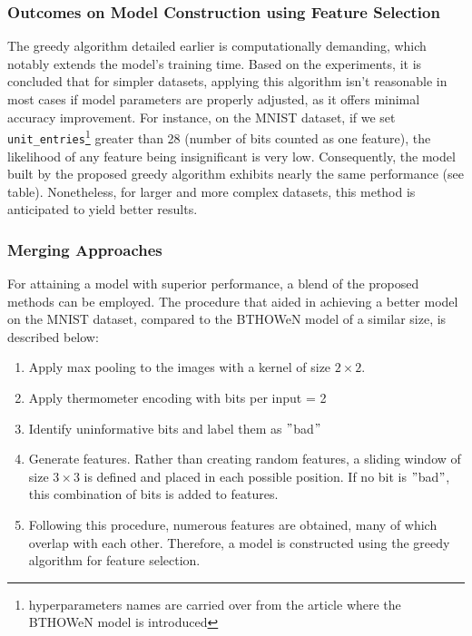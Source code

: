 \documentclass{article}[12pt]
\begin{document}
\subsubsection{Outcomes on Model Construction using Feature Selection}
The greedy algorithm detailed earlier is computationally demanding, which notably extends the model's training time.
Based on the experiments, it is concluded that for simpler datasets, applying this algorithm isn't reasonable in most cases if model parameters are properly adjusted, as it offers minimal accuracy improvement.
For instance, on the MNIST dataset, if we set \texttt{unit\_entries}\footnote{hyperparameters names are carried over from the article where the BTHOWeN model is introduced} greater than 28 (number of bits counted as one feature), the likelihood of any feature being insignificant is very low.
Consequently, the model built by the proposed greedy algorithm exhibits nearly the same performance (see table).
Nonetheless, for larger and more complex datasets, this method is anticipated to yield better results.

\subsubsection{Merging Approaches} \label{subsubsec:best-res}
For attaining a model with superior performance, a blend of the proposed methods can be employed.
The procedure that aided in achieving a better model on the MNIST dataset, compared to the BTHOWeN model of a similar size, is described below:

\begin{enumerate}
    \item Apply max pooling to the images with a kernel of size $2\times{}2$.
    \item Apply thermometer encoding with bits per input = 2
    \item Identify uninformative bits and label them as \("\)bad\("\)
    \item Generate features.
          Rather than creating random features, a sliding window of size $3 \times 3$ is defined and placed in each possible position.
          If no bit is \("\)bad\("\), this combination of bits is added to features.
    \item Following this procedure, numerous features are obtained, many of which overlap with each other.
          Therefore, a model is constructed using the greedy algorithm for feature selection.
\end{enumerate}
\end{document}
